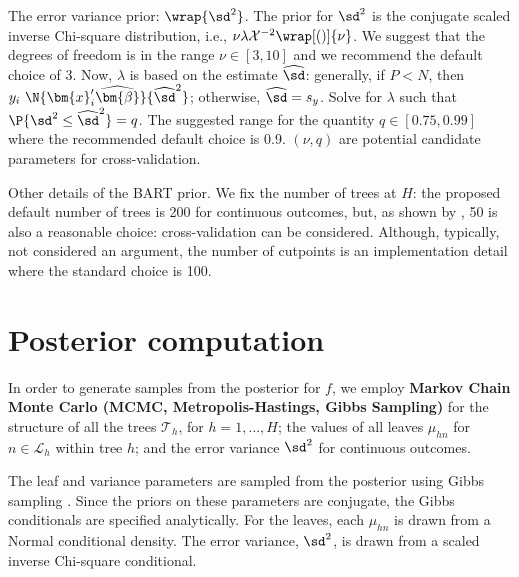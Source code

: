 \documentclass[cmbright,doublespace]{WileySTAT-V1}
\theoremstyle{plain}
\begin{document}
The error variance prior: $\wrap{\sd^2}$.
The prior for $\sd^2$
is the conjugate scaled inverse Chi-square distribution, i.e., $\nu
\lambda \mathcal{X}^{-2}\wrap[()]{\nu}$. %
We suggest that the degrees of freedom is in the range $\nu
\in [3, 10]$ and we recommend the default choice of 3.  Now,
$\lambda$
is based on the estimate $\widehat\sd$:
generally, if $P<N$,
then $y_i~\N{\bm{x}_i'\widehat{\bm{\beta}}}{\widehat{\sd}^2}$;
otherwise, $\widehat{\sd}=s_y$.
Solve for $\lambda$
such that $\P{\sd^2\le
  \widehat{\sd}^2}=q$.  The suggested range for the quantity $q \in [0.75,
0.99]$ where the recommended default choice is 0.9.  $(\nu,
q)$ are potential candidate parameters for cross-validation.

Other details of the BART prior.  We fix the number of trees at
$H$: the proposed default number of trees is 200 for continuous
outcomes, but, as shown by \citet{BleiKape14}, 50 is also a reasonable
choice: cross-validation can be considered.  Although, typically, not
considered an argument, the number of cutpoints is an
implementation detail where the standard choice is
100.  %

\section{Posterior computation}\label{post}

In order to generate samples from the posterior for $f$, we employ
\textbf{Markov Chain Monte Carlo (MCMC, Metropolis-Hastings, Gibbs
  Sampling)} \citep{Hanc16} for the structure of all the trees
$\mathcal{T}_h$, for $h=1,\dots,H$; the values of all leaves
$\mu_{hn}$ for $n \in \mathcal{L}_h$ within tree $h$; and the error
variance $\sd^2$ for continuous outcomes.

The leaf and variance parameters are sampled from the posterior using
Gibbs sampling \citep{GemaGema84,GelfSmit90}.  Since the priors on these
parameters are conjugate, the Gibbs conditionals are specified
analytically. For the leaves, each $\mu_{hn}$ is drawn from a Normal
conditional density. The error variance, $\sd^2$, is drawn from a
scaled inverse Chi-square conditional.
\end{document}
